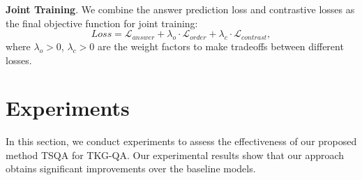 \documentclass[11pt]{article}
\newcommand{\xhdr}[1]{{\noindent\bfseries #1}.}
\newcommand{\gt}[1]{{{\textcolor{cyan}{[gt: #1]}}}}
\begin{document}


\xhdr{Joint Training} We combine the answer prediction loss and contrastive losses as the final objective function for joint training:
\begin{equation}
    Loss = \mathcal{L}_{answer} + \lambda_{o} \cdot \mathcal{L}_{order} + \lambda_{c} \cdot \mathcal{L}_{contrast},
\end{equation}
where $\lambda_{o} > 0$, $\lambda_{c} >0$ are the weight factors to make tradeoffs between different losses.



\section{Experiments}
In this section, we conduct experiments to assess the effectiveness of our proposed method TSQA for TKG-QA. 
Our experimental results show that our approach obtains significant improvements over the baseline models.
\end{document}
